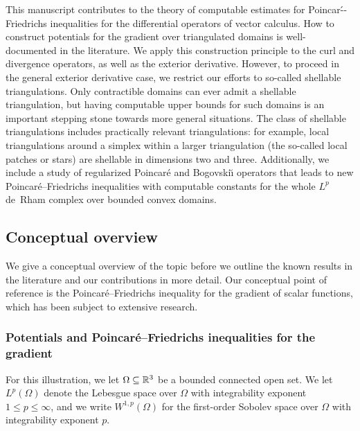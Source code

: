 \documentclass[10pt,a4paper]{article}
\begin{document}
This manuscript contributes to the theory of computable estimates for Poincar\'--Friedrichs inequalities for the differential operators of vector calculus. 
How to construct potentials for the gradient over triangulated domains is well-documented in the literature. 
We apply this construction principle to the curl and divergence operators, as well as the exterior derivative. 
However, to proceed in the general exterior derivative case, we restrict our efforts to so-called shellable triangulations. 
Only contractible domains can ever admit a shellable triangulation, but having computable upper bounds for such domains is an important stepping stone towards more general situations. 
The class of shellable triangulations includes practically relevant triangulations: 
for example, local triangulations around a simplex within a larger triangulation (the so-called local patches or stars) are shellable in dimensions two and three. 
Additionally, we include a study of regularized Poincar\'e and Bogovski\u{\i} operators that leads to new Poincar\'e--Friedrichs inequalities with computable constants for the whole $L^{p}$ de~Rham complex over bounded convex domains.




\subsection{Conceptual overview}

We give a conceptual overview of the topic before we outline the known results in the literature and our contributions in more detail. 
Our conceptual point of reference is the Poincar\'e--Friedrichs inequality for the gradient of scalar functions, 
which has been subject to extensive research.


\subsubsection{Potentials and Poincar\'e--Friedrichs inequalities for the gradient}

For this illustration, we let $\Omega \subseteq {\mathbb R}^3$ be a bounded connected open set. 
We let $L^{p}(\Omega)$ denote the Lebesgue space over $\Omega$ with integrability exponent $1 \leq p \leq \infty$, 
and we write $W^{1,p}(\Omega)$ for the first-order Sobolev space over $\Omega$ with integrability exponent $p$. 
\end{document}
